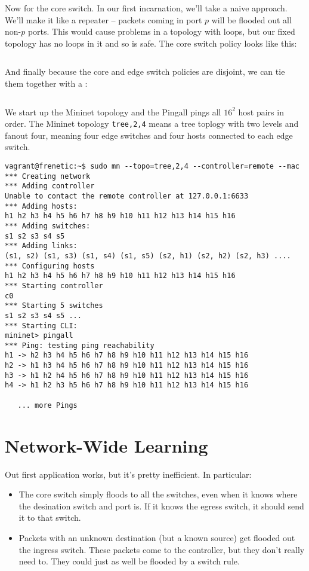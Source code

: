 Now for the core switch.  In our first incarnation, we'll take a naive approach.  We'll make it like
a repeater -- packets coming in port $p$ will be flooded out all non-$p$ ports.  This would cause problems
in a topology with loops, but our fixed topology has no loops in it and so is safe.  The core
switch policy looks like this:

\inputminted[firstline=42,lastline=49]{python}{code/multiswitch_topologies/multiswitch1.py}

And finally because the core and edge switch policies are disjoint, we can tie them together with a 
:

\inputminted[firstline=51,lastline=52]{python}{code/multiswitch_topologies/multiswitch1.py}

We start up the Mininet topology and the Pingall pings all $16^2$ host pairs in order.  The Mininet 
topology \texttt{tree,2,4} means a tree toplogy with two levels and fanout four, meaning four
edge switches and four hosts connected to each edge switch.   

\begin{verbatim}
vagrant@frenetic:~$ sudo mn --topo=tree,2,4 --controller=remote --mac
*** Creating network
*** Adding controller
Unable to contact the remote controller at 127.0.0.1:6633
*** Adding hosts:
h1 h2 h3 h4 h5 h6 h7 h8 h9 h10 h11 h12 h13 h14 h15 h16
*** Adding switches:
s1 s2 s3 s4 s5
*** Adding links:
(s1, s2) (s1, s3) (s1, s4) (s1, s5) (s2, h1) (s2, h2) (s2, h3) ....
*** Configuring hosts
h1 h2 h3 h4 h5 h6 h7 h8 h9 h10 h11 h12 h13 h14 h15 h16
*** Starting controller
c0
*** Starting 5 switches
s1 s2 s3 s4 s5 ...
*** Starting CLI:
mininet> pingall
*** Ping: testing ping reachability
h1 -> h2 h3 h4 h5 h6 h7 h8 h9 h10 h11 h12 h13 h14 h15 h16
h2 -> h1 h3 h4 h5 h6 h7 h8 h9 h10 h11 h12 h13 h14 h15 h16
h3 -> h1 h2 h4 h5 h6 h7 h8 h9 h10 h11 h12 h13 h14 h15 h16
h4 -> h1 h2 h3 h5 h6 h7 h8 h9 h10 h11 h12 h13 h14 h15 h16

   ... more Pings
\end{verbatim}

\section{Network-Wide Learning}

Out first application works, but it's pretty inefficient.  In particular:

\begin{itemize}
\item The core switch simply floods to all the switches, even when it knows where the desination switch 
and port is.  If it knows the egress switch, it should send it to that switch.  
\item Packets with an unknown destination (but a known source) get flooded out the ingress switch.  
These packets come to the controller, but they don't really need to.  They could just as well be flooded 
by a switch rule.  
\end{itemize}

